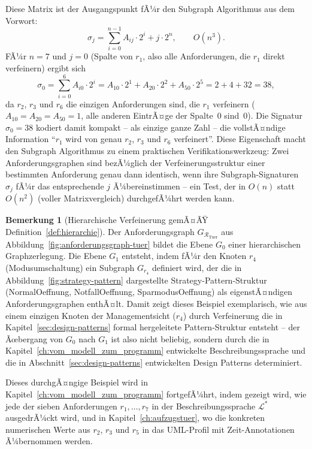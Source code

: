 ﻿\documentclass[a4paper,12pt]{report}
\theoremstyle{definition}
\newtheorem{bemerkung}{Bemerkung}[section]
\begin{document}
\noindent
Diese Matrix ist der Ausgangspunkt fÃ¼r den Subgraph Algorithmus aus dem
Vorwort:
\[
\sigma_j = \sum_{i=0}^{n-1} A_{ij} \cdot 2^i + j \cdot 2^n, \qquad O(n^3).
\]
FÃ¼r $n = 7$ und $j = 0$ (Spalte von $r_1$, also alle Anforderungen, die
$r_1$ direkt verfeinern) ergibt sich
\[
\sigma_0 = \sum_{i=0}^{6} A_{i0} \cdot 2^i = A_{10}\cdot2^1 + A_{20}\cdot2^2
+ A_{50}\cdot2^5 = 2 + 4 + 32 = 38,
\]
da $r_2$, $r_3$ und $r_6$ die einzigen Anforderungen sind, die $r_1$
verfeinern ($A_{10}=A_{20}=A_{50}=1$, alle anderen EintrÃ¤ge der Spalte~$0$
sind~$0$). Die Signatur $\sigma_0 = 38$ kodiert damit kompakt -- als einzige
ganze Zahl -- die vollstÃ¤ndige Information ``$r_1$ wird von genau $r_2$,
$r_3$ und $r_6$ verfeinert''. Diese Eigenschaft macht den
Subgraph Algorithmus zu einem praktischen Verifikationswerkzeug: Zwei
Anforderungsgraphen sind bezÃ¼glich der Verfeinerungsstruktur einer
bestimmten Anforderung genau dann identisch, wenn ihre Subgraph-Signaturen
$\sigma_j$ fÃ¼r das entsprechende $j$ Ã¼bereinstimmen -- ein Test, der in
$O(n)$ statt $O(n^2)$ (voller Matrixvergleich) durchgefÃ¼hrt werden kann.

\begin{bemerkung}[Hierarchische Verfeinerung gemÃ¤ÃŸ Definition~\ref{def:hierarchie}]
Der Anforderungsgraph $G_{\mathcal{R}_{\text{Tuer}}}$ aus
Abbildung~\ref{fig:anforderungsgraph-tuer} bildet die Ebene $G_0$ einer
hierarchischen Graphzerlegung. Die Ebene $G_1$ entsteht, indem fÃ¼r den
Knoten $r_4$ (Modusumschaltung) ein Subgraph $G_{r_4}$ definiert wird, der
die in Abbildung~\ref{fig:strategy-pattern} dargestellte
Strategy-Pattern-Struktur (NormalOeffnung, NotfallOeffnung,
SparmodusOeffnung) als eigenstÃ¤ndigen Anforderungsgraphen enthÃ¤lt. Damit
zeigt dieses Beispiel exemplarisch, wie aus einem einzigen Knoten der
Managementsicht ($r_4$) durch Verfeinerung die in
Kapitel~\ref{sec:design-patterns} formal hergeleitete Pattern-Struktur
entsteht -- der Ãœbergang von $G_0$ nach $G_1$ ist also nicht beliebig,
sondern durch die in Kapitel~\ref{ch:vom_modell_zum_programm} entwickelte
Beschreibungssprache und die in Abschnitt~\ref{sec:design-patterns}
entwickelten Design Patterns determiniert.
\end{bemerkung}

\noindent
Dieses durchgÃ¤ngige Beispiel wird in
Kapitel~\ref{ch:vom_modell_zum_programm} fortgefÃ¼hrt, indem gezeigt wird,
wie jede der sieben Anforderungen $r_1, \ldots, r_7$ in der
Beschreibungssprache $\mathcal{L}^*$ ausgedrÃ¼ckt wird, und in
Kapitel~\ref{ch:aufzugstuer}, wo die konkreten numerischen Werte aus $r_2$,
$r_3$ und $r_5$ in das UML-Profil mit Zeit-Annotationen Ã¼bernommen werden.
\end{document}
